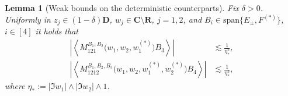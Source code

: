 \documentclass[10pt]{amsart}
\newtheorem{lemma}[theorem]{Lemma}
\numberwithin{equation}{section}
\newcommand{\R}{\mathbf{R}}
\newcommand{\C}{\mathbf{C}}
\begin{document}
\begin{lemma}[Weak bounds on the deterministic counterparts]\label{lem:M_bounds_weak} Fix $\delta>0$. Uniformly in $z_j\in(1-\delta)\mathbf{D}$, $w_j\in\C\setminus\R$, $j=1,2$, and $B_i\in \mathrm{span}\{E_\pm,F^{(*)}\}$, $i\in [4]$ it holds that
\begin{align}
\left\vert\left\langle M_{121}^{B_1,B_2}\big(w_1,w_2,w_1^{(*)}\big)B_3\right\rangle\right\vert &\lesssim \frac{1}{\eta_*^2},\label{eq:M3_bound_weak}\\
\left\vert\left\langle M_{1212}^{B_1,B_2,B_3}\big(w_1,w_2,w_1^{(*)},w_2^{(*)}\big)B_4\right\rangle\right\vert&\lesssim \frac{1}{\eta_*^3},\label{eq:M4_bound_weak}
\end{align}
where $\eta_*:=|\Im w_1|\wedge|\Im w_2|\wedge 1$.
\end{lemma}
\end{document}
